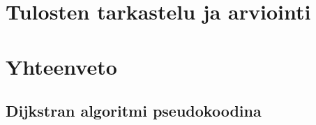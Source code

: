 \documentclass{config/tauthesis}
\numberwithin{equation}{section}
\theoremstyle{definition}
\begin{document}
\chapter{Tulosten tarkastelu ja arviointi} \label{ch:10_tulosten_tarkastelu_ja_arviointi}
  
\chapter{Yhteenveto} \label{ch:11_yhteenveto}
  
\printbibliography[heading=bibintoc]

\begin{appendices}
  \chapter{Dijkstran algoritmi pseudokoodina} \label{ch:13_liite_dijkstran_algoritmi}
  
\end{appendices}
\end{document}
